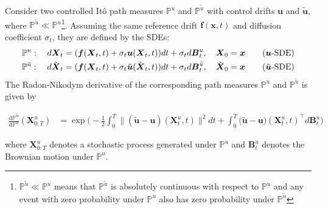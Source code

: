 \documentclass{article}
\begin{document}
\begin{theorem}\label{theorem:rnd-ito-process}
Consider two controlled Itô path measures $\mathbb{P}^u$ and $\mathbb{P}^{\tilde{u}}$ with control drifts $\boldsymbol{u}$ and $\tilde{\boldsymbol{u}}$, where $\mathbb{P}^{\tilde{u}}\ll \mathbb{P}^u$\footnote{$\mathbb{P}^{\tilde{u}}\ll\mathbb{P}^u$ means that $\mathbb{P}^{\tilde{u}}$ is absolutely continuous with respect to $\mathbb{P}^u$ and any event with zero probability under $\mathbb{P}^u$ also has zero probability under $\mathbb{P}^{\tilde{u}}$}. Assuming the same  reference drift $\boldsymbol{f}(\boldsymbol{x},t)$ and diffusion coefficient $\sigma_t$, they are defined by the SDEs: 
\begin{align}
    \mathbb{P}^u:\quad d\boldsymbol{X}_t&=(\boldsymbol{f}(\boldsymbol{X}_t,t)+\sigma_t\boldsymbol{u}(\boldsymbol{X}_t,t)) dt+\sigma_t d\boldsymbol{B}^u_t, \quad \boldsymbol{X}_0=\boldsymbol{x}\tag{$\boldsymbol{u}$-SDE}\label{eq:rnd-proof-sde1}\\
    \mathbb{P}^{\tilde{u}}:\quad d\tilde{\boldsymbol{X}}_t &=(\boldsymbol{f}(\boldsymbol{X}_t,t)+\sigma_t\tilde{\boldsymbol{u}}(\tilde{\boldsymbol{X}}_t, t))dt+ \sigma_t d\boldsymbol{B}^{\tilde{u}}_t, \quad \tilde{\boldsymbol{X}}_0=\boldsymbol{x}\tag{$\tilde{\boldsymbol{u}}$-SDE}\label{eq:rnd-proof-sde2}
\end{align}
The Radon-Nikodym derivative of the corresponding path measures $\mathbb{P}^u$ and $\mathbb{P}^{\tilde{u}}$ is given by
\begin{small}
\begin{align}
    \frac{\mathrm{d}\mathbb{P}^{\tilde{u}}}{\mathrm{d}\mathbb{P}^u}(\boldsymbol{X}^u_{0:T})&=\exp\bigg(-\frac{1}{2}\int_0^T\|(\tilde{\boldsymbol{u}}-\boldsymbol{u})(\boldsymbol{X}^u_t,t)\|^2dt+\int_0^T\big(\tilde{\boldsymbol{u}}-\boldsymbol{u}\big)(\boldsymbol{X}^u_t,t)^\top d\boldsymbol{B}^u_t\bigg)\tag{Path RND}\label{eq:theorem-path-rnd}
\end{align}
\end{small}
where $\boldsymbol{X}^u_{0:T}$ denotes a stochastic process generated under $\mathbb{P}^u$ and $\boldsymbol{B}^u_t$ denotes the Brownian motion under $\mathbb{P}^u$.
\end{theorem}
\end{document}
